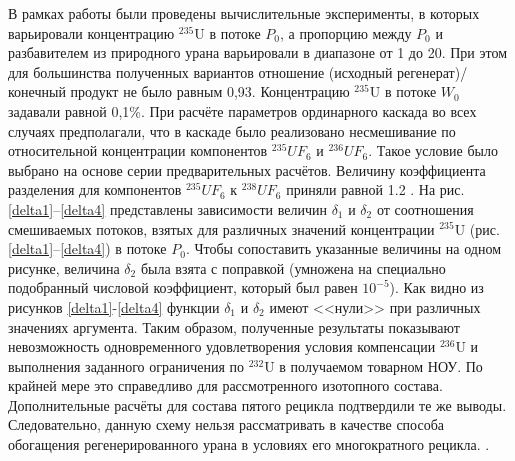 В рамках работы были проведены вычислительные эксперименты, в которых варьировали концентрацию $^{235}$U в потоке $P_0$, а пропорцию между $P_0$ и разбавителем из природного урана варьировали в диапазоне от 1 до 20. При этом для большинства полученных вариантов отношение (исходный регенерат)/конечный продукт не было равным 0,93. Концентрацию $^{235}$U в потоке $W_0$ задавали равной 0,1\%. При расчёте параметров ординарного каскада во всех случаях предполагали, что в каскаде было реализовано несмешивание по относительной концентрации компонентов $^{235}UF_6$ и $^{236}UF_6$. Такое условие было выбрано на основе серии предварительных расчётов. Величину коэффициента разделения для компонентов  $^{235}UF_6$ к $^{238}UF_6$ приняли равной 1.2  \cite{smirnovEvolutionIsotopicComposition2012}. 
На рис. \ref{delta1}--\ref{delta4} представлены зависимости величин $\delta_1$ и $\delta_2$ от соотношения смешиваемых потоков, взятых для различных значений концентрации $^{235}$U (рис. \ref{delta1}--\ref{delta4}) в потоке $P_0$. Чтобы сопоставить указанные величины на одном рисунке, величина $\delta_2$ была взята с поправкой (умножена на специально подобранный числовой коэффициент, который был равен $10^{-5}$).
Как видно из рисунков \ref{delta1}-\ref{delta4} функции $\delta_1$ и $\delta_2$ имеют <<нули>> при различных значениях аргумента. Таким образом, полученные результаты показывают невозможность одновременного удовлетворения условия компенсации $^{236}$U и выполнения заданного ограничения по $^{232}$U в получаемом товарном НОУ. По крайней мере это справедливо для рассмотренного изотопного состава. Дополнительные расчёты для состава пятого рецикла подтвердили те же выводы. Следовательно, данную схему нельзя рассматривать в качестве способа обогащения регенерированного урана в условиях его многократного рецикла. .


